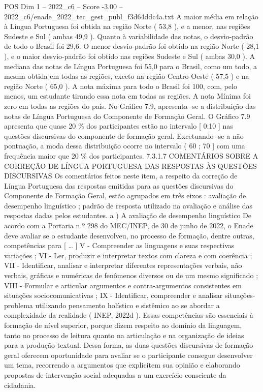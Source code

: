 \begin{textsample}{POS Dim 1 – 2022\_c6 – Score -3.00 – 2022\_c6/enade\_2022\_tec\_gest\_publ\_f3d64ddc4a.txt}
A maior média em relação à Língua Portuguesa foi obtida na região Norte ( 53,8 ), e a menor, nas regiões Sudeste e Sul ( ambas 49,9 ).
Quanto à variabilidade das notas, o desvio-padrão de todo o Brasil foi 29,6.
O menor desvio-padrão foi obtido na região Norte ( 28,1 ), e o maior desvio-padrão foi obtido nas regiões Sudeste e Sul ( ambas 30,0 ).
A mediana das notas de Língua Portuguesa foi 55,0 para o Brasil, como um todo, a mesma obtida em todas as regiões, exceto na região Centro-Oeste ( 57,5 ) e na região Norte ( 65,0 ).
A nota máxima para todo o Brasil foi 100, com, pelo menos, um estudante tirando essa nota em todas as regiões.
A nota Mínima foi zero em todas as regiões do país.
No Gráfico 7.9, apresenta -se a distribuição das notas de Língua Portuguesa do Componente de Formação Geral.
O Gráfico 7.9 apresenta que quase 20 \% dos participantes estão no intervalo [ 0:10 ] nas questões discursivas do componente de formação geral.
Excetuando -se a não pontuação, a moda dessa distribuição ocorre no intervalo ( 60 ; 70 ] com uma frequência maior que 20 \% dos participantes. 7.3.1.7 COMENTÁRIOS SOBRE A CORREÇÃO DE LÍNGUA PORTUGUESA DAS RESPOSTAS ÀS QUESTÕES DISCURSIVAS Os comentários feitos neste item, a respeito da correção de Língua Portuguesa das respostas emitidas para as questões discursivas do Componente de Formação Geral, estão agrupados em três eixos : avaliação de desempenho linguístico ; padrão de resposta utilizado na avaliação e análise das respostas dadas pelos estudantes. a ) A avaliação de desempenho linguístico De acordo com a Portaria n.º 298 do MEC/INEP, de 30 de junho de 2022, o Enade deve avaliar se o estudante desenvolveu, no processo de formação, dentre outras, competências para [ … ] V - Compreender as linguagens e suas respectivas variações ; VI - Ler, produzir e interpretar textos com clareza e com coerência ; VII - Identificar, analisar e interpretar diferentes representações verbais, não verbais, gráficas e numéricas de fenômenos diversos ou de um mesmo significado ; VIII - Formular e articular argumentos e contra-argumentos consistentes em situações sociocomunicativas ; IX - Identificar, compreender e analisar situações-problema utilizando pensamento holístico e sistêmico ao se abordar a complexidade da realidade ( INEP, 2022d ).
Essas competências são essenciais à formação de nível superior, porque dizem respeito ao domínio da linguagem, tanto no processo de leitura quanto na articulação e na organização de ideias para a produção textual.
Dessa forma, as duas questões discursivas de formação geral oferecem oportunidade para avaliar se o participante consegue desenvolver um tema, recorrendo a argumentos que explicitem sua opinião e elaborando propostas de intervenção social adequadas a um exercício consciente da cidadania.

\end{textsample}
